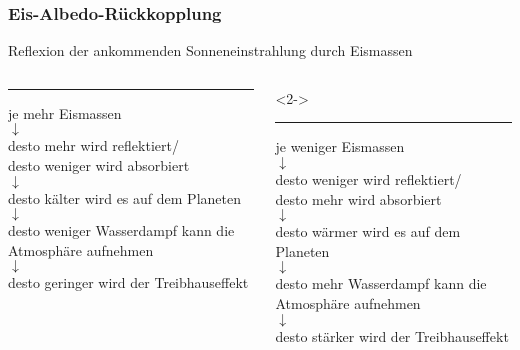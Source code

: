 \begin{frame}
	\frametitle{Eis-Albedo-Rückkopplung}%
	 Reflexion der ankommenden Sonneneinstrahlung durch Eismassen
	 
	 \begin{columns}[T] %
	 	\begin{column}{.48\textwidth}
	 		\centering
	 		\color{blue}\rule{\linewidth}{4pt}
	 		\color{black} 
	 		je mehr Eismassen\\
	 		$\downarrow$\\
	 		desto mehr wird reflektiert/\\
	 		desto weniger wird absorbiert\\
	 		$\downarrow$\\
	 		desto kälter wird es auf dem Planeten\\
	 		$\downarrow$\\
	 		desto weniger Wasserdampf kann die Atmosphäre aufnehmen\\
	 		$\downarrow$\\
	 		desto geringer wird der Treibhauseffekt
	 	\end{column}%
	 	\hfill%
	 	\begin{column}{.48\textwidth}<2->
	 		\centering
	 		\color{red}\rule{\linewidth}{4pt}
	 		\color{black}
	 		je weniger Eismassen\\
	 		$\downarrow$\\
	 		desto weniger wird reflektiert/\\
	 		desto mehr wird absorbiert\\
	 		$\downarrow$\\
	 		desto wärmer wird es auf dem Planeten\\
	 		$\downarrow$\\
	 		desto mehr Wasserdampf kann die Atmosphäre aufnehmen\\
	 		$\downarrow$\\
	 		desto stärker wird der Treibhauseffekt
	 	\end{column}%
	 \end{columns}
	 

\end{frame}

